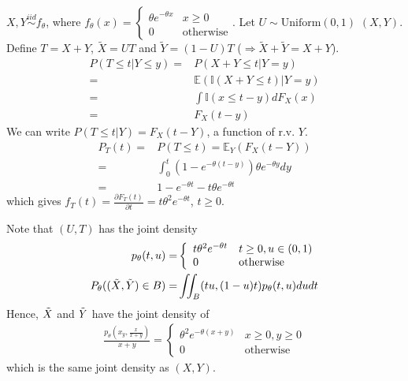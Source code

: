 \begin{example}
    $X, Y\overset{iid}{\sim}f_\theta$, where $f_\theta(x)=\left\{\begin{array}{ll}
        \theta e^{-\theta x} & x\geq 0 \\
        0 & \text{otherwise}
    \end{array}\right.$.
    Let $U\sim\text{Uniform}(0,1)$ $(X,Y)$. 
    Define $T=X+Y$, $\tilde{X}=UT$ and $\tilde{Y}=(1-U)T$ ($\Rightarrow\tilde{X}+\tilde{Y}=X+Y$).
    \begin{align}
        P(T\leq t|Y\leq y)
        =& P(X+Y\leq t|Y=y)\\
        =& \mathbb{E}(\mathbb{I}(X+Y\leq t)|Y=y)\\
        =& \int\mathbb{I}(x\leq t-y)dF_X(x)\\
        =& F_X(t-y)
    \end{align}
    We can write $P(T\leq t|Y)=F_X(t-Y)$, a function of r.v. $Y$.
    \begin{align}
        P_T(t)
        =& P(T\leq t) = \mathbb{E}_Y(F_X(t-Y))\\
        =& \int_{0}^t{(1-e^{-\theta(t-y)})\theta e^{-\theta y}}dy\\
        =& 1-e^{-\theta t} - t\theta e^{-\theta t}
    \end{align}
    which gives $f_T(t)=\frac{\partial F_T(t)}{\partial t}=t\theta^2e^{-\theta t}$, $t\geq 0$.

    Note that $(U,T)$ has the joint density
    \begin{align}
        p_\theta(t,u)=&\left\{\begin{array}{ll}
            t\theta^2e^{-\theta t} & t\geq 0,u\in(0,1) \\
            0 & \text{otherwise}
        \end{array}\right.\\
        P_\theta((\Tilde{X},\Tilde{Y})\in B)=&\iint_{B}(tu,(1-u)t)p_\theta(t,u)dudt
    \end{align}
    Hence, $\Tilde{X}$ and $\Tilde{Y}$ have the joint density of
    \begin{gather}
        \frac{p_\theta(x_y,\frac{x}{x+y})}{x+y}=\left\{\begin{array}{ll}
            \theta^2e^{-\theta(x+y)} & x\geq 0,y\geq 0 \\
            0 & \text{otherwise}
        \end{array}\right.
    \end{gather}
    which is the same joint density as $(X,Y)$.
\end{example}

